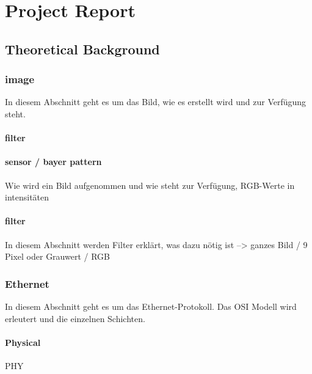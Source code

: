 
\chapter{Project Report}

\section{Theoretical Background}
\subsection{image}
In diesem Abschnitt geht es um das Bild, wie es erstellt wird und zur Verfügung steht.
\subsubsection{filter}

\subsubsection{sensor / bayer pattern}
Wie wird ein Bild aufgenommen und wie steht zur Verfügung, RGB-Werte in intensitäten

\subsubsection{filter}
In diesem Abschnitt werden Filter erklärt, was dazu nötig ist --> ganzes Bild / 9 Pixel oder Grauwert / RGB

\subsection{Ethernet}
In diesem Abschnitt geht es um das Ethernet-Protokoll. Das OSI Modell wird erleutert und die
einzelnen Schichten.
\subsubsection{Physical} 
PHY

